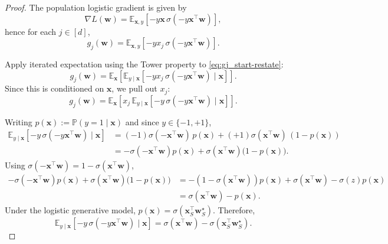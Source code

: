 \documentclass[10pt,a4paper]{amsart}
\begin{document}
\begin{proof}
The population logistic gradient is given by
\[
\nabla L(\boldsymbol w)=\mathbb E_{\boldsymbol x,y}\!\left[-y\boldsymbol x\,\sigma(-y\boldsymbol x^\top \boldsymbol w)\right],
\]
hence for each $j\in[d]$,
\begin{equation}
\label{eq:gj_start-restate}
g_j(\boldsymbol w)=\mathbb E_{\boldsymbol x,y}\!\left[-y x_j\,\sigma(-y\boldsymbol x^\top \boldsymbol w)\right].
\end{equation}

Apply iterated expectation using the Tower property to \eqref{eq:gj_start-restate}:
\[
g_j(\boldsymbol w)
=
\mathbb E_{\boldsymbol x}\!\left[
\mathbb E_{y\mid \boldsymbol x}\!\left[-y x_j\,\sigma(-y\boldsymbol x^\top \boldsymbol w)\mid \boldsymbol x\right]
\right].
\]
Since this is conditioned on $\boldsymbol x$, we pull out $x_{j}$:
\begin{equation}
\label{eq:pull_out_Xj}
g_j(\boldsymbol w)
=
\mathbb E_{\boldsymbol x}\!\left[
x_j\,
\mathbb E_{y\mid \boldsymbol x}\!\left[-y\,\sigma(-y\boldsymbol x^\top \boldsymbol w)\mid \boldsymbol x\right]
\right].
\end{equation}

Writing $p(\boldsymbol x):=\mathbb P(y=1\mid \boldsymbol x)$ and since $y\in\{-1,+1\}$,
\begin{align}
\mathbb E_{y\mid \boldsymbol x}\!\left[-y\,\sigma(-y \boldsymbol x^\top \boldsymbol w)\mid \boldsymbol x\right]
&=
(-1)\sigma(-\boldsymbol x^\top \boldsymbol w)\,p(\boldsymbol x)
+
(+1)\sigma(\boldsymbol x^\top \boldsymbol w)\,(1-p(\boldsymbol x)) \nonumber\\
&=
-\sigma(-\boldsymbol x^\top \boldsymbol w)p(\boldsymbol x)+\sigma(\boldsymbol x^\top \boldsymbol w)\big(1-p(\boldsymbol x)\big).
\label{eq:cond_exp_raw}
\end{align}
Using $\sigma(-\boldsymbol x^\top \boldsymbol w)=1-\sigma(\boldsymbol x^\top \boldsymbol w)$,
\begin{align}
-\sigma(-\boldsymbol x^\top \boldsymbol w)p(\boldsymbol x)+\sigma(\boldsymbol x^\top \boldsymbol w)\big(1-p(\boldsymbol x)\big)
&=
-(1-\sigma(\boldsymbol x^\top \boldsymbol w))p(\boldsymbol x)+\sigma(\boldsymbol x^\top \boldsymbol w)-\sigma(z)p(\boldsymbol x) \nonumber\\
&=
\sigma(\boldsymbol x^\top \boldsymbol w)-p(\boldsymbol x).
\label{eq:cond_exp_simplified}
\end{align}
Under the logistic generative model, $p(\boldsymbol x)=\sigma(\boldsymbol x_S^\top \boldsymbol w_S^\star)$.
Therefore,
\begin{equation}
\label{eq:cond_exp_final}
\mathbb E_{y\mid \boldsymbol x}\!\left[-y\,\sigma(-y\boldsymbol x^\top \boldsymbol w)\mid \boldsymbol x\right]
=
\sigma(\boldsymbol x^\top \boldsymbol w)-\sigma(\boldsymbol x_S^\top \boldsymbol w_S^\star).
\end{equation}



\end{proof}
\end{document}

